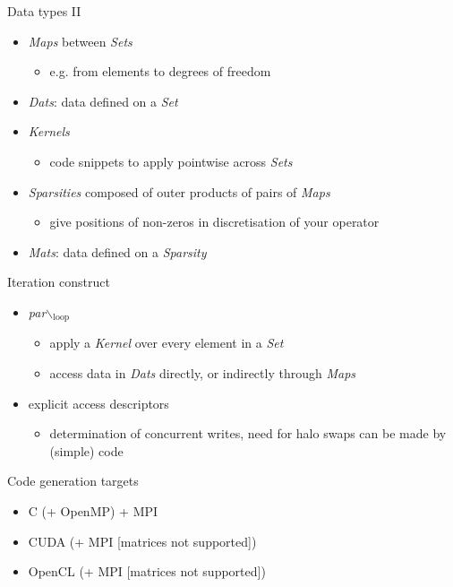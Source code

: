 \documentclass[presentation]{beamer}
\begin{document}
\begin{frame}[label={sec:orgheadline7}]{Data types II}
\begin{itemize}
\item \emph{Maps} between \emph{Sets}
\begin{itemize}
\item e.g. from elements to degrees of freedom
\end{itemize}
\item \emph{Dats}: data defined on a \emph{Set}
\item \emph{Kernels}
\begin{itemize}
\item code snippets to apply pointwise across \emph{Sets}
\end{itemize}
\item \emph{Sparsities} composed of outer products of pairs of \emph{Maps}
\begin{itemize}
\item give positions of non-zeros in discretisation of your operator
\end{itemize}
\item \emph{Mats}: data defined on a \emph{Sparsity}
\end{itemize}
\end{frame}

\begin{frame}[label={sec:orgheadline8}]{Iteration construct}
\begin{itemize}
\item \emph{par$\backslash$\(_{\text{loop}}\)}
\begin{itemize}
\item apply a \emph{Kernel} over every element in a \emph{Set}
\item access data in \emph{Dats} directly, or indirectly through \emph{Maps}
\end{itemize}
\item explicit access descriptors
\begin{itemize}
\item determination of concurrent writes, need for halo swaps can be
made by (simple) code
\end{itemize}
\end{itemize}
\end{frame}

\begin{frame}[label={sec:orgheadline9}]{Code generation targets}
\begin{itemize}
\item C (+ OpenMP) + MPI
\item CUDA (+ MPI [matrices not supported])
\item OpenCL (+ MPI [matrices not supported])
\end{itemize}
\end{frame}
\end{document}
